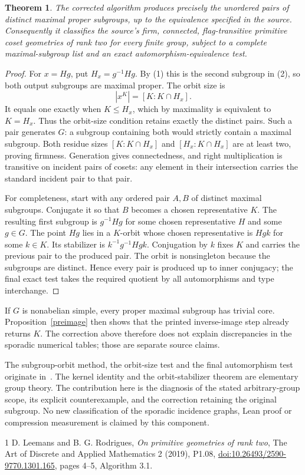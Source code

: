 \documentclass[10pt,a4paper]{article}
\newtheorem{theorem}[proposition]{Theorem}
\begin{document}
\begin{theorem}\label{correct}
The corrected algorithm produces precisely the unordered pairs of
distinct maximal proper subgroups, up to the equivalence specified in
the source. Consequently it classifies the source's firm, connected,
flag-transitive primitive coset geometries of rank two for every finite
group, subject to a complete maximal-subgroup list and an exact
automorphism-equivalence test.
\end{theorem}
\begin{proof}
For $x=Hg$, put $H_x=g^{-1}Hg$. By (1) this is the second subgroup
in (2), so both output subgroups are maximal proper. The orbit size is
\[
                 |x^K|=[K:K\cap H_x].
\]
It equals one exactly when $K\leq H_x$, which by maximality is
equivalent to $K=H_x$. Thus the orbit-size condition retains exactly
the distinct pairs. Such a pair generates $G$: a subgroup containing
both would strictly contain a maximal subgroup. Both residue sizes
$[K:K\cap H_x]$ and $[H_x:K\cap H_x]$ are at least two, proving
firmness. Generation gives connectedness, and right multiplication
is transitive on incident pairs of cosets: any element in their
intersection carries the standard incident pair to that pair.

For completeness, start with any ordered pair $A,B$ of distinct
maximal subgroups. Conjugate it so that $B$ becomes a chosen
representative $K$. The resulting first subgroup is $g^{-1}Hg$ for
some chosen representative $H$ and some $g\in G$. The point $Hg$
lies in a $K$-orbit whose chosen representative is $Hgk$ for some
$k\in K$. Its stabilizer is $k^{-1}g^{-1}Hgk$. Conjugation by $k$
fixes $K$ and carries the previous pair to the produced pair. The
orbit is nonsingleton because the subgroups are distinct. Hence every
pair is produced up to inner conjugacy; the final exact test takes
the required quotient by all automorphisms and type interchange.
\end{proof}

If $G$ is nonabelian simple, every proper maximal subgroup has trivial
core. Proposition~\ref{preimage} then shows that the printed
inverse-image step already returns $K$. The correction above therefore
does not explain discrepancies in the sporadic numerical tables; those
are separate source claims.

The subgroup-orbit method, the orbit-size test and the final
automorphism test originate in~\cite{LR}. The kernel identity and the
orbit-stabilizer theorem are elementary group theory. The contribution
here is the diagnosis of the stated arbitrary-group scope, its explicit
counterexample, and the correction retaining the original subgroup.
No new classification of the sporadic incidence graphs, Lean proof or
compression measurement is claimed by this component.

\begin{thebibliography}{1}
 D. Leemans and B. G. Rodrigues,
\emph{On primitive geometries of rank two},
The Art of Discrete and Applied Mathematics 2 (2019), P1.08,
\href{https://doi.org/10.26493/2590-9770.1301.165}{doi:10.26493/2590-9770.1301.165},
pages 4--5, Algorithm 3.1.
\end{thebibliography}
\end{document}
